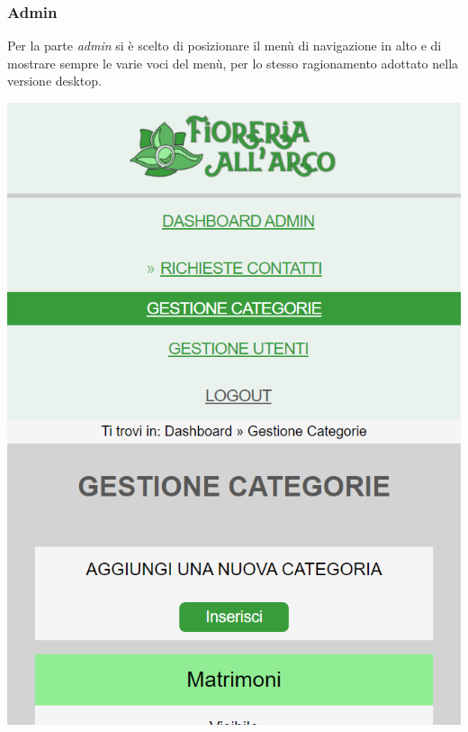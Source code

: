 \subsubsection{Admin}
Per la parte \textit{admin} si è scelto di posizionare il menù di navigazione in alto e di mostrare sempre le varie voci del menù, per lo stesso ragionamento adottato nella versione desktop.
\begin{center}
\includegraphics[scale = 0.35]{../latex/images/mobileadmin.png}\\[0.5cm]
\end{center}
